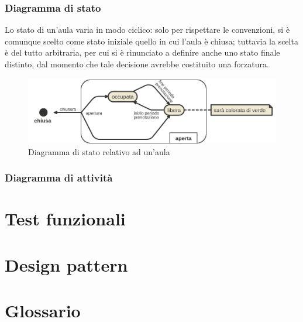 \documentclass{article}
\begin{document}
	\section{Diagramma di stato}
	Lo stato di un'aula varia in modo ciclico: solo per rispettare le convenzioni, si è comunque scelto come stato iniziale quello in cui l'aula è chiusa; tuttavia la scelta è del tutto arbitraria, per cui si è rinunciato a definire anche uno stato finale distinto, dal momento che tale decisione avrebbe costituito una forzatura.\\
	\begin{figure}[h]
		\includegraphics[scale=0.45]{stato}
		\centering
		\caption{Diagramma di stato relativo ad un'aula}
	\end{figure}
	\newpage
	\section{Diagramma di attività}
	\newpage
	\part{Test funzionali}
	\newpage
	\part{Design pattern}
	\newpage
	\appendix
	\part{Glossario}
\end{document}
